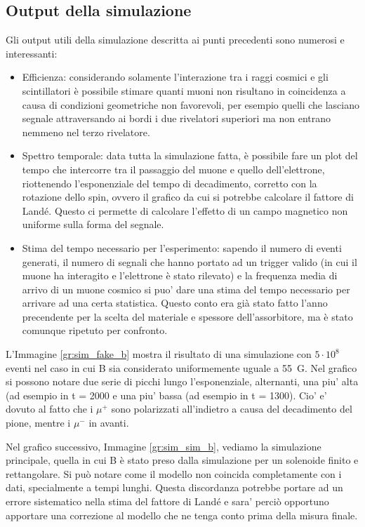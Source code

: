 \subsection{Output della simulazione}
Gli output utili della simulazione descritta ai punti precedenti sono numerosi e interessanti:
\begin{itemize}
\item Efficienza: considerando solamente l'interazione tra i raggi cosmici e gli scintillatori è possibile stimare quanti muoni non risultano in coincidenza a causa
di condizioni geometriche non favorevoli, per esempio quelli che lasciano segnale attraversando ai bordi i due rivelatori superiori ma non entrano nemmeno nel terzo
rivelatore.
\item Spettro temporale: data tutta la simulazione fatta, è possibile fare un plot del tempo che intercorre tra il passaggio del muone e quello dell'elettrone, riottenendo
l'esponenziale del tempo di decadimento, corretto con la rotazione dello spin, ovvero il grafico da cui si potrebbe calcolare il fattore di Land\'e. Questo ci permette di calcolare l'effetto di un campo magnetico non uniforme sulla forma del segnale.
\item Stima del tempo necessario per l'esperimento: sapendo il numero di eventi generati, il numero di segnali che hanno portato ad un trigger valido (in cui il muone ha interagito e l'elettrone \`e stato rilevato) e la frequenza media di arrivo di un muone cosmico si puo' dare una stima del tempo necessario per arrivare ad una certa statistica. Questo conto era gi\`a stato fatto l'anno precendente per la scelta del materiale e spessore dell'assorbitore, ma \`e stato comunque ripetuto per confronto.
\end{itemize}



L'Immagine \ref{gr:sim_fake_b} mostra il risultato di una simulazione con $5\cdot 10^8$ eventi nel caso in cui B sia considerato uniformemente uguale a 55~G. Nel grafico si possono notare due serie di picchi lungo l'esponenziale, alternanti, una piu' alta (ad esempio in t = 2000 e una piu' bassa (ad esempio in t = 1300). Cio' e' dovuto al fatto che i $\mu^+$ sono polarizzati all'indietro a causa del decadimento del pione, mentre i $\mu^-$ in avanti. 

Nel grafico successivo, Immagine \ref{gr:sim_sim_b}, vediamo la simulazione principale, quella in cui B \`e stato preso dalla simulazione per un solenoide finito e rettangolare. Si pu\`o notare come il modello non coincida completamente con i dati, specialmente a tempi lunghi. Questa discordanza potrebbe portare ad un errore sistematico nella stima del fattore di Land\'e e sara' perci\`o opportuno apportare una correzione al modello che ne tenga conto prima della misura finale.


